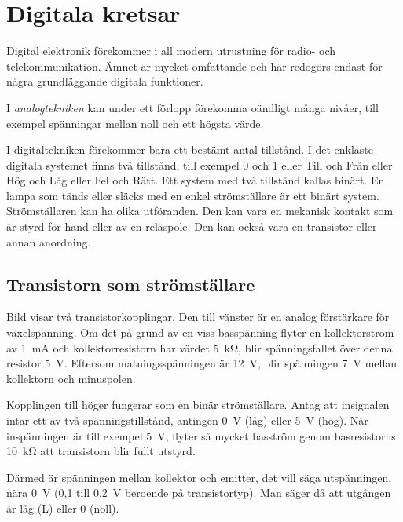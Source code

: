 \section{Digitala kretsar}
\label{digitala kretsar}

Digital elektronik förekommer i all modern utrustning för radio- och
telekommunikation.
Ämnet är mycket omfattande och här redogörs endast för några grundläggande
digitala funktioner.

I \emph{analogtekniken} kan under ett förlopp förekomma oändligt många nivåer,
till exempel spänningar mellan noll och ett högsta värde.

I digitaltekniken förekommer bara ett bestämt antal tillstånd.
I det enklaste digitala systemet finns två tillstånd, till exempel 0 och 1 eller
Till och Från eller Hög och Låg eller Fel och Rätt.
Ett system med två tillstånd kallas binärt.
En lampa som tänds eller släcks med en enkel strömställare är ett binärt system.
Strömställaren kan ha olika utföranden.
Den kan vara en mekanisk kontakt som är styrd för hand eller av en reläspole.
Den kan också vara en transistor eller annan anordning.

\subsection{Transistorn som strömställare}
\label{transistor_strömställare}


Bild  visar två transistorkopplingar.
Den till vänster är en analog förstärkare för växelspänning.
Om det på grund av en viss basspänning flyter en kollektorström av
\SI{1}{\milli\ampere} och kollektorresistorn har värdet \SI{5}{\kilo\ohm}, blir
spänningsfallet över denna resistor \SI{5}{\volt}.
Eftersom matningsspänningen är \SI{12}{\volt}, blir spänningen \SI{7}{\volt}
mellan kollektorn och minuspolen.

Kopplingen till höger fungerar som en binär strömställare.
Antag att insignalen intar ett av två spänningstillstånd, antingen
\SI{0}{\volt} (låg) eller \SI{5}{\volt} (hög).
När inspänningen är till exempel \SI{5}{\volt}, flyter så mycket basström genom
basresistorns \SI{10}{\kilo\ohm} att transistorn blir fullt utstyrd.

Därmed är spänningen mellan kollektor och emitter, det vill säga utspänningen,
nära \SI{0}{\volt} (0,1 till \SI{0,2}{\volt} beroende på transistortyp).
Man säger då att utgången är låg (L) eller 0 (noll).

